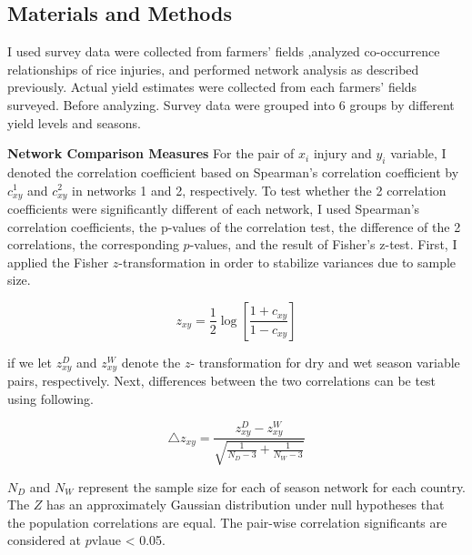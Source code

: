 \subsection{Materials and Methods}
I used survey data were collected from farmers' fields ,analyzed co-occurrence relationships of rice injuries, and performed network analysis as described previously. Actual yield estimates were collected from each farmers' fields surveyed. Before analyzing. Survey data were grouped into 6 groups by different yield levels and seasons.  

\textbf{Network Comparison Measures}
For the pair of $x_{i}$ injury and $y_{i}$ variable, I denoted the correlation coefficient based on Spearman's correlation coefficient by $c_{xy}^1$ and $c_{xy}^2$ in networks 1 and 2, respectively. To test whether the 2 correlation coefficients were significantly different of each network, I used Spearman's correlation coefficients, the p-values of the correlation test, the difference of the 2 correlations, the corresponding $p$-values, and the result of Fisher's z-test. First, I applied the Fisher $z$-transformation in order to stabilize variances due to sample size.

\begin{equation}
z_{xy} = \frac{1}{2} \log\left[{\frac{1 + c_{xy}}{1 - c_{xy}}}\right]
\end{equation}

if we let $z_{xy}^D $ and $z_{xy}^W$ denote the $z$- transformation for dry and wet season variable pairs, respectively. 
Next, differences between the two correlations can be test using following. 

\begin{equation}
\triangle z_{xy} = \frac{z_{xy}^D - z_{xy}^W}{\sqrt{\frac{1}{N_{D}-3}+ \frac{1}{N_{W}-3}}}
\end{equation}

$N_{D}$ and $N_{W}$ represent the sample size for each of season network for each country. The $Z$ has an approximately Gaussian distribution under null hypotheses that the population correlations are equal. The pair-wise correlation significants are considered at $p$vlaue < 0.05.

